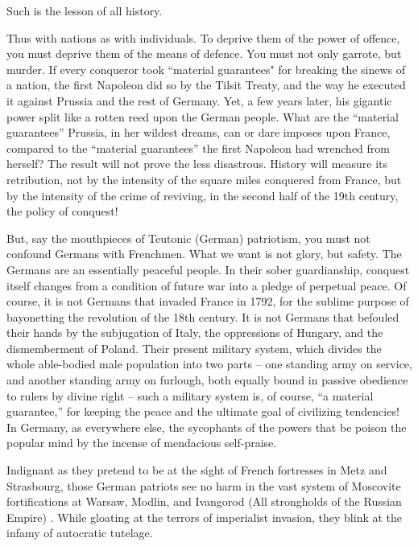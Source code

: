 \documentclass{book}
\begin{document}
Such is the lesson of all history.

Thus with nations as with individuals. To deprive them of the power of
offence, you must deprive them of the means of defence. You must not only
garrote, but murder. If every conqueror took “material guarantees" for
breaking the sinews of a nation, the first Napoleon did so by the Tilsit
Treaty, and the way he executed it against Prussia and the rest of
Germany. Yet, a few years later, his gigantic power split like a rotten
reed upon the German people. What are the “material guarantees” Prussia,
in her wildest dreams, can or dare imposes upon France, compared to the
“material guarantees” the first Napoleon had wrenched from herself? The
result will not prove the less disastrous. History will measure its
retribution, not by the intensity of the square miles conquered from
France, but by the intensity of the crime of reviving, in the second half
of the 19th century, the policy of conquest!

But, say the mouthpieces of Teutonic (German) patriotism, you must not
confound Germans with Frenchmen. What we want is not glory, but safety.
The Germans are an essentially peaceful people. In their sober
guardianship, conquest itself changes from a condition of future war into
a pledge of perpetual peace. Of course, it is not Germans that invaded
France in 1792, for the sublime purpose of bayonetting the revolution of
the 18th century. It is not Germans that befouled their hands by the
subjugation of Italy, the oppressions of Hungary, and the dismemberment of
Poland. Their present military system, which divides the whole able-bodied
male population into two parts – one standing army on service, and another
standing army on furlough, both equally bound in passive obedience to
rulers by divine right – such a military system is, of course, “a material
guarantee,” for keeping the peace and the ultimate goal of civilizing
tendencies! In Germany, as everywhere else, the sycophants of the powers
that be poison the popular mind by the incense of mendacious self-praise.

Indignant as they pretend to be at the sight of French fortresses in Metz
and Strasbourg, those German patriots see no harm in the vast system of
Moscovite fortifications at Warsaw, Modlin, and Ivangorod (All strongholds
of the Russian Empire) . While gloating at the terrors of imperialist
invasion, they blink at the infamy of autocratic tutelage.
\end{document}
